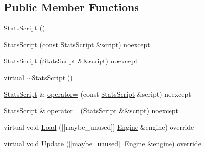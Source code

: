 \subsection*{Public Member Functions}
\begin{DoxyCompactItemize}
\item 
\mbox{\hyperlink{classmage_1_1script_1_1_stats_script_a6863940cb48633fbd5fc56547dc72a76}{Stats\+Script}} ()
\item 
\mbox{\hyperlink{classmage_1_1script_1_1_stats_script_a3fb4aa69fc341df0fe2c2ad03f0ff278}{Stats\+Script}} (const \mbox{\hyperlink{classmage_1_1script_1_1_stats_script}{Stats\+Script}} \&script) noexcept
\item 
\mbox{\hyperlink{classmage_1_1script_1_1_stats_script_a9ac8ca59744a668504010b0f496f266f}{Stats\+Script}} (\mbox{\hyperlink{classmage_1_1script_1_1_stats_script}{Stats\+Script}} \&\&script) noexcept
\item 
virtual \mbox{\hyperlink{classmage_1_1script_1_1_stats_script_a5b9b30aa6939968c2aee8cdf11f6486c}{$\sim$\+Stats\+Script}} ()
\item 
\mbox{\hyperlink{classmage_1_1script_1_1_stats_script}{Stats\+Script}} \& \mbox{\hyperlink{classmage_1_1script_1_1_stats_script_a538428ec1763e0fb4b41839e7943ca56}{operator=}} (const \mbox{\hyperlink{classmage_1_1script_1_1_stats_script}{Stats\+Script}} \&script) noexcept
\item 
\mbox{\hyperlink{classmage_1_1script_1_1_stats_script}{Stats\+Script}} \& \mbox{\hyperlink{classmage_1_1script_1_1_stats_script_ae99dbfbff061fcc916c968d670a1e481}{operator=}} (\mbox{\hyperlink{classmage_1_1script_1_1_stats_script}{Stats\+Script}} \&\&script) noexcept
\item 
virtual void \mbox{\hyperlink{classmage_1_1script_1_1_stats_script_a4bfada754da5ca76591c5e7b9b0b1f51}{Load}} (\mbox{[}\mbox{[}maybe\+\_\+unused\mbox{]}\mbox{]} \mbox{\hyperlink{classmage_1_1_engine}{Engine}} \&engine) override
\item 
virtual void \mbox{\hyperlink{classmage_1_1script_1_1_stats_script_aad8c3b8fb846d47605b1f1d14f1ea157}{Update}} (\mbox{[}\mbox{[}maybe\+\_\+unused\mbox{]}\mbox{]} \mbox{\hyperlink{classmage_1_1_engine}{Engine}} \&engine) override
\end{DoxyCompactItemize}

